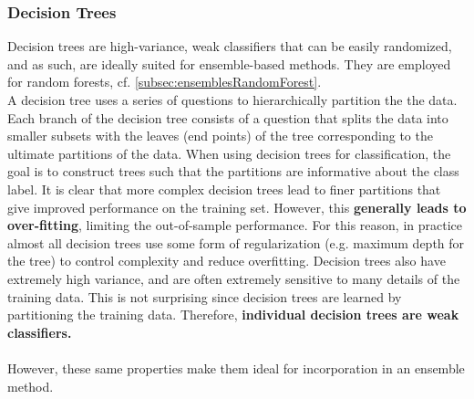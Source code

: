 \subsubsection{Decision Trees}
\label{subsubsec:ensemblesRFDecisionTree}
Decision trees are high-variance, weak classifiers that can be easily randomized, and as such, are ideally suited for ensemble-based methods.
They are employed for random forests, cf. \ref{subsec:ensemblesRandomForest}.\\
A decision tree uses a series of questions to hierarchically partition the the data. Each branch of the decision tree consists of a question that splits the data into smaller subsets with the leaves (end points) of the tree corresponding to the ultimate partitions of the data. When using decision trees for classification, the goal is to construct trees such that the partitions are informative about the class label. It is clear that more complex decision trees lead to finer partitions that give improved performance on the training set. However, this \textbf{generally leads to over-fitting}, limiting the out-of-sample performance. For this reason, in practice almost all decision trees use some form of regularization (e.g. maximum depth for the tree) to control complexity and reduce overfitting. Decision trees also have extremely high variance, and are often extremely sensitive to many details of the training data. This is not surprising since decision trees are learned by partitioning the training data. Therefore, \textbf{individual decision trees are weak classifiers.}\\
\\
However, these same properties make them ideal for incorporation in an ensemble method.\\

























